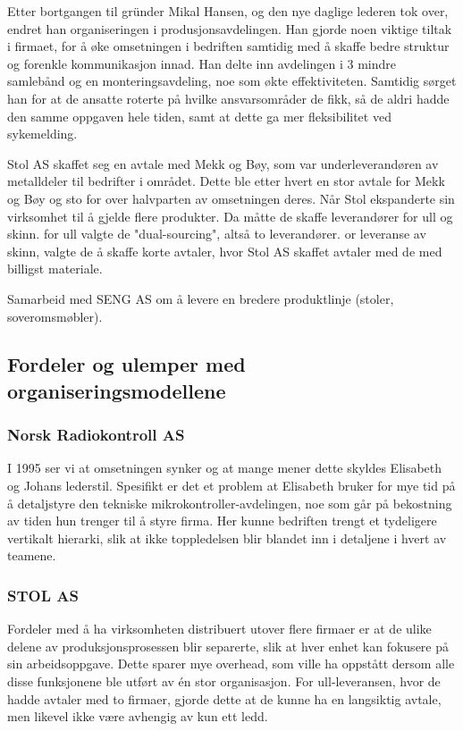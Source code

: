 Etter bortgangen til gründer Mikal Hansen, og den nye daglige lederen tok over, endret han organiseringen i produsjonsavdelingen.
Han gjorde noen viktige tiltak i firmaet, for å øke omsetningen i bedriften samtidig med å skaffe bedre struktur og forenkle kommunikasjon innad.
Han delte inn avdelingen i 3 mindre samlebånd og en monteringsavdeling, noe som økte effektiviteten. Samtidig sørget han for at de ansatte roterte på hvilke ansvarsområder de fikk, så de aldri hadde den samme oppgaven hele tiden, samt at dette ga mer fleksibilitet ved sykemelding.

Stol AS skaffet seg en avtale med Mekk og Bøy, som var underleverandøren av metalldeler til bedrifter i området. Dette ble etter hvert en stor avtale for Mekk og Bøy og sto for over halvparten av omsetningen deres. Når Stol ekspanderte sin virksomhet til å gjelde flere produkter. Da måtte de skaffe leverandører for ull og skinn. for ull valgte de "dual-sourcing", altså to leverandører. or leveranse av skinn, valgte de å skaffe korte avtaler, hvor Stol AS skaffet avtaler med de med billigst materiale.

Samarbeid med SENG AS om å levere en bredere produktlinje (stoler, soveromsmøbler).

\subsection{Fordeler og ulemper med organiseringsmodellene}

\subsubsection{Norsk Radiokontroll AS}

I 1995 ser vi at omsetningen synker og at mange mener dette skyldes Elisabeth og Johans lederstil. Spesifikt er det et problem at Elisabeth bruker for mye tid på å detaljstyre den tekniske mikrokontroller-avdelingen, noe som går på bekostning av tiden hun trenger til å styre firma.
Her kunne bedriften trengt et tydeligere vertikalt hierarki, slik at ikke toppledelsen blir blandet inn i detaljene i hvert av teamene.

\subsubsection{STOL AS}

Fordeler med å ha virksomheten distribuert utover flere firmaer er at de ulike delene av produksjonsprosessen blir separerte, slik at hver enhet kan fokusere på sin arbeidsoppgave.
Dette sparer mye overhead, som ville ha oppstått dersom alle disse funksjonene ble utført av én stor organisasjon.
For ull-leveransen, hvor de hadde avtaler med to firmaer, gjorde dette at de kunne ha en langsiktig avtale, men likevel ikke være avhengig av kun ett ledd.


